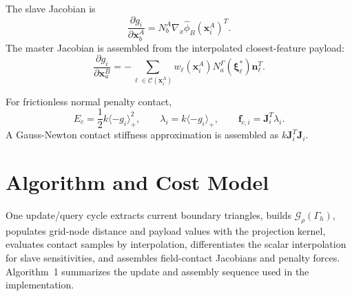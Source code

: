 \documentclass[11pt]{article}
\begin{document}
The slave Jacobian is
\begin{equation}
\frac{\partial g_i}{\partial \mathbf{x}_b^A}
=
N_b^A \nabla_x\hat{\phi}_B(\mathbf{x}_i^A)^T .
\end{equation}
The master Jacobian is assembled from the interpolated closest-feature payload:
\begin{equation}
\frac{\partial g_i}{\partial \mathbf{x}_a^B}
=
-
\sum_{\ell\in\mathcal{C}(\mathbf{x}_i^A)}
w_\ell(\mathbf{x}_i^A)
N_a^\Gamma(\boldsymbol{\xi}_\ell^\ast)
\mathbf{n}_\ell^T .
\end{equation}

For frictionless normal penalty contact,
\begin{equation}
E_c =
\frac{1}{2}k\langle -g_i\rangle_+^2,
\qquad
\lambda_i =
k\langle -g_i\rangle_+,
\qquad
\mathbf{f}_{c,i} =
\mathbf{J}_i^T\lambda_i .
\end{equation}
A Gauss-Newton contact stiffness approximation is assembled as \(k\mathbf{J}_i^T\mathbf{J}_i\).

\section{Algorithm and Cost Model}

One update/query cycle extracts current boundary triangles, builds \(\mathcal{G}_\rho(\Gamma_h)\), populates grid-node distance and payload values with the projection kernel, evaluates contact samples by interpolation, differentiates the scalar interpolation for slave sensitivities, and assembles field-contact Jacobians and penalty forces. Algorithm~1 summarizes the update and assembly sequence used in the implementation.
\end{document}
